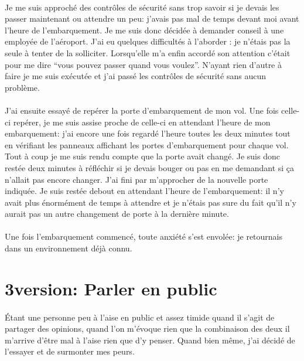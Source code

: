 \paragraph{} Je me suis approché des contrôles de sécurité sans trop savoir si
je devais les passer maintenant ou attendre un peu: j'avais pas mal de temps
devant moi avant l'heure de l'embarquement. Je me suis donc décidée à demander
conseil à une employée de l'aéroport. J'ai eu quelques difficultés à l'aborder
: je n'étais pas la seule à tenter de la solliciter. Lorsqu'elle m'a enfin
accordé son attention c'était pour me dire ``vous pouvez passer quand vous
voulez''. N'ayant rien d'autre à faire je me suis exécutée et j'ai passé les
contrôles de sécurité sans aucun problème.

\paragraph{} J'ai ensuite essayé de repérer la porte d'embarquement de mon vol.
Une fois celle-ci repérer, je me suis assise proche de celle-ci en attendant
l'heure de mon embarquement: j'ai encore une fois regardé l'heure toutes les
deux minutes tout en vérifiant les panneaux affichant les portes d'embarquement
pour chaque vol. Tout à coup je me suis rendu compte que la porte avait changé.
Je suis donc restée deux minutes à réfléchir si je devais bouger ou pas en me
demandant si ça n'allait pas encore changer. J'ai fini par m'approcher de la
nouvelle porte indiquée. Je suis restée debout en attendant l'heure de
l'embarquement: il n'y avait plus énormément de temps à attendre et je n'étais
pas sure du fait qu'il n'y aurait pas un autre changement de porte à la
dernière minute.

\paragraph{} Une fois l'embarquement commencé, toute anxiété s'est envolée: je
retournais dans un environnement déjà connu.

\section{3\ieme version: Parler en public}

\paragraph{} Étant une personne peu à l'aise en public et assez timide quand il
s'agit de partager des opinions, quand l'on m'évoque rien que la combinaison
des deux il m'arrive d'être mal à l'aise rien que d'y penser. Quand bien même,
j'ai décidé de l'essayer et de surmonter mes peurs.


